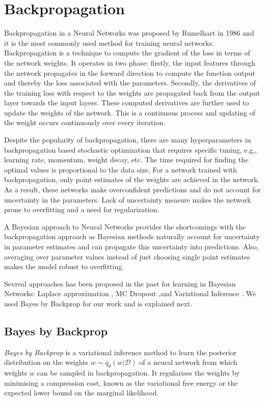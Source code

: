 \section{Backpropagation}

Backpropagation in a Neural Networks was proposed by Rumelhart \cite{Rumelhart} in 1986 and it is the most commonly used method for training neural networks. Backpropagation is a technique to compute the gradient of the loss in terms of the network weights. It operates in two phase: firstly, the input features through the network propagates in the forward direction to compute the function output and thereby the loss associated with the parameters. Secondly, the derivatives of the training loss with respect to the weights
are propagated back from the output layer towards the input layers.
These computed derivatives are further used to update the weights of the network. This is a continuous process and updating of the weight occurs continuously over every iteration. 

Despite the popularity of backpropagation, there are many hyperparameters in backpropagation based stochastic optimization that requires specific tuning, e.g., learning rate, momentum, weight decay, etc. The time required for finding the optimal values is proportional to the data size. For a network trained with backpropagation, only point estimates of the weights are achieved in the network. As a result, these networks make overconfident predictions and do not account for uncertainty in the parameters. Lack of uncertainty measure makes the network prone to overfitting and a need for regularization.

A Bayesian approach to Neural Networks provides the shortcomings with the backpropagation approach \cite{mackay1996hyperparameters} as Bayesian methods naturally account for uncertainty in parameter estimates and can propagate this uncertainty into predictions.
Also, averaging over parameter values instead of just choosing single point estimates makes the model robust to overfitting. 

Sevreal approaches has been proposed in the past for learning in Bayesian Networks: Laplace approximation \cite{Mackay1991APB}, MC Dropout \cite{gal2015bayesian},and Variational Inference \cite{hinton1993keeping} \cite{graves2011practical} \cite{blundell2015weight}. We used Bayes by Backprop \cite{blundell2015weight} for our work and is explained next.

\subsection{Bayes by Backprop}
\textit{Bayes by Backprop} \cite{graves2011practical, blundell2015weight} is a variational inference method to learn the posterior distribution on the weights $w \sim q_{\theta}(w|\mathcal{D})$ of a neural network from which weights $w$ can be sampled in backpropagation. 
It regularises the weights by minimising a compression cost, known as the variational free energy or the expected lower bound on the marginal likelihood.

